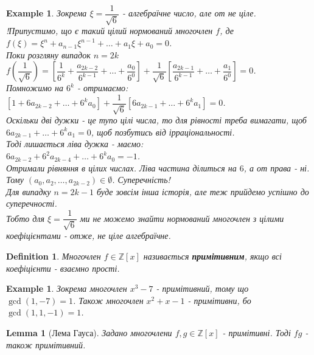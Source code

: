 \documentclass[a4paper, 14pt]{extarticle}
\theoremstyle{theoremdd}
\theoremstyle{theoremdd}
\newtheorem{definition}[theorem]{Definition}
\theoremstyle{theoremdd}
\theoremstyle{theoremdd}
\newtheorem{example}[theorem]{Example}
\theoremstyle{theoremdd}
\theoremstyle{theoremdd}
\theoremstyle{theoremdd}
\newtheorem{lemma}[theorem]{Lemma}
\theoremstyle{theoremdd}
\begin{document}
\begin{example}
Зокрема $\xi = \dfrac{1}{\sqrt{6}}$ - алгебраїчне число, але от не ціле.\\
!Припустимо, що є такий цілий нормований многочлен $f$, де\\
$f(\xi) = \xi^n + a_{n-1} \xi^{n-1} + \dots + a_1 \xi + a_0 = 0$.\\
Поки розгляну випадок $n = 2k$\\
$f\left( \dfrac{1}{\sqrt{6}} \right) = \left[\dfrac{1}{6^k} + \dfrac{a_{2k-2}}{6^{k-1}} + \dots + \dfrac{a_0}{6^0} \right] + \dfrac{1}{\sqrt{6}} \left[ \dfrac{a_{2k-1}}{6^{k-1}} + \dots + \dfrac{a_1}{6^0} \right] = 0$.\\
Помножимо на $6^k$ - отримаємо:\\
$[1+6a_{2k-2} + \dots + 6^ka_0] + \dfrac{1}{\sqrt{6}}[6a_{2k-1} + \dots + 6^k a_1] = 0$.\\
Оскільки дві дужки - це тупо цілі числа, то для рівності треба вимагати, щоб $6a_{2k-1} + \dots + 6^k a_1 = 0$, щоб позбутись від ірраціональності.\\
Тоді лишається ліва дужка - маємо:\\
$6a_{2k-2} + 6^2a_{2k-4} + \dots + 6^k a_0 = -1$.\\
Отримали рівняння в цілих числах. Ліва частина ділиться на $6$, а от права - ні. Тому $(a_0,a_2,\dots,a_{2k-2}) \in \emptyset$. Суперечність!\\
Для випадку $n = 2k-1$ буде зовсім інша історія, але теж прийдемо успішно до суперечності.\\
Тобто для $\xi = \dfrac{1}{\sqrt{6}}$ ми не можемо знайти нормований многочлен з цілими коефіцієнтами - отже, не ціле алгебраїчне.
\end{example}

\begin{definition}
Многочлен $f \in \mathbb{Z}[x]$ називається \textbf{примітивним}, якщо всі коефіцієнти - взаємно прості.
\end{definition}

\begin{example}
Зокрема многочлен $x^3 - 7$ - примітивний, тому що \\ $\gcd(1,-7) = 1$. Також многочлен $x^2+x-1$ - примітивни, бо \\ $\gcd(1,1,-1) = 1$.
\end{example}

\begin{lemma}[Лема Гауса]
Задано многочлени $f,g \in \mathbb{Z}[x]$ - примітивні. Тоді $fg$ - також примітивний.
\end{lemma}
\end{document}
